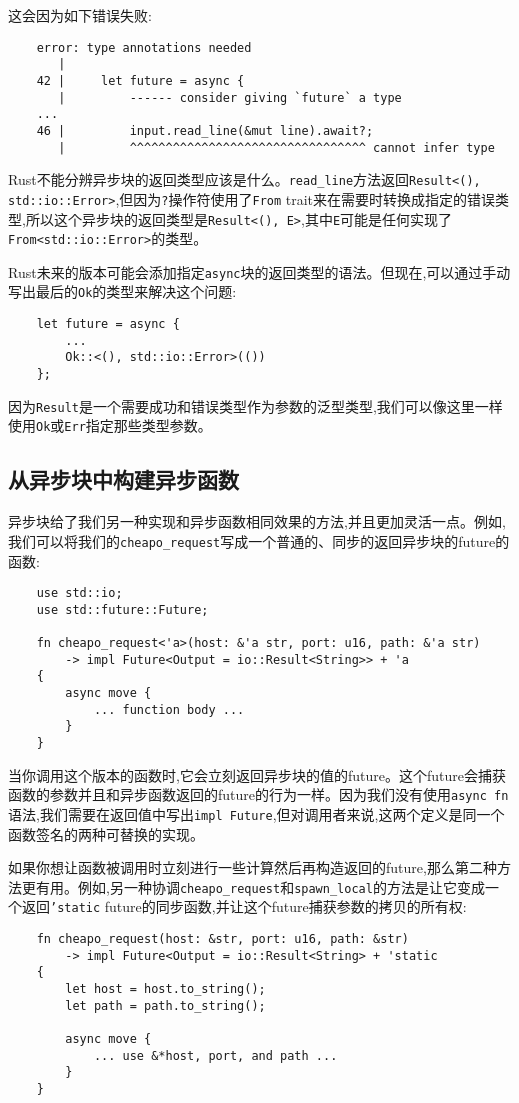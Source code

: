 这会因为如下错误失败:
\begin{verbatim}
    error: type annotations needed
       |
    42 |     let future = async {
       |         ------ consider giving `future` a type
    ...
    46 |         input.read_line(&mut line).await?;
       |         ^^^^^^^^^^^^^^^^^^^^^^^^^^^^^^^^^ cannot infer type
\end{verbatim}

Rust不能分辨异步块的返回类型应该是什么。\texttt{read\_line}方法返回\texttt{Result<(), std::io::Error>},但因为\texttt{?}操作符使用了\texttt{From} trait来在需要时转换成指定的错误类型,所以这个异步块的返回类型是\texttt{Result<(), E>},其中\texttt{E}可能是任何实现了\texttt{From<std::io::Error>}的类型。

Rust未来的版本可能会添加指定\texttt{async}块的返回类型的语法。但现在,可以通过手动写出最后的\texttt{Ok}的类型来解决这个问题:
\begin{verbatim}
    let future = async {
        ...
        Ok::<(), std::io::Error>(())
    };
\end{verbatim}

因为\texttt{Result}是一个需要成功和错误类型作为参数的泛型类型,我们可以像这里一样使用\texttt{Ok}或\texttt{Err}指定那些类型参数。

\subsection{从异步块中构建异步函数}
异步块给了我们另一种实现和异步函数相同效果的方法,并且更加灵活一点。例如,我们可以将我们的\texttt{cheapo\_request}写成一个普通的、同步的返回异步块的future的函数:
\begin{verbatim}
    use std::io;
    use std::future::Future;

    fn cheapo_request<'a>(host: &'a str, port: u16, path: &'a str)
        -> impl Future<Output = io::Result<String>> + 'a
    {
        async move {
            ... function body ...
        }
    }
\end{verbatim}

当你调用这个版本的函数时,它会立刻返回异步块的值的future。这个future会捕获函数的参数并且和异步函数返回的future的行为一样。因为我们没有使用\texttt{async fn}语法,我们需要在返回值中写出\texttt{impl Future},但对调用者来说,这两个定义是同一个函数签名的两种可替换的实现。

如果你想让函数被调用时立刻进行一些计算然后再构造返回的future,那么第二种方法更有用。例如,另一种协调\texttt{cheapo\_request}和\texttt{spawn\_local}的方法是让它变成一个返回\texttt{'static} future的同步函数,并让这个future捕获参数的拷贝的所有权:
\begin{verbatim}
    fn cheapo_request(host: &str, port: u16, path: &str)    
        -> impl Future<Output = io::Result<String> + 'static
    {
        let host = host.to_string();
        let path = path.to_string();

        async move {
            ... use &*host, port, and path ...
        }
    }
\end{verbatim}

